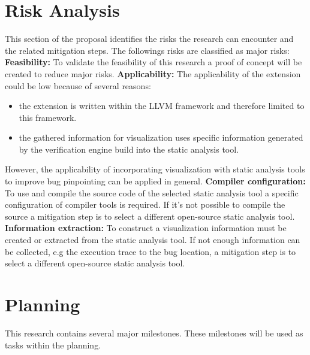 \section{Risk Analysis}
This section of the proposal identifies the risks the research can encounter and the related mitigation steps. \newline \newline
The followings risks are classified as major risks: \newline \newline
\textbf{Feasibility:} \newline
To validate the feasibility of this research a proof of concept will be created to reduce major risks. \newline
\textbf{Applicability:} \newline
The applicability of the extension could be low because of several reasons: \newline
\begin{itemize}
\item the extension is written within the LLVM framework and therefore limited to this framework.
\item the gathered information for visualization uses specific information generated by the verification engine build into the static analysis tool.
\end{itemize}
However, the applicability of incorporating visualization with static analysis tools to improve bug pinpointing can be applied in general. \newline \newline
\textbf{Compiler configuration:}\newline
To use and compile the source code of the selected static analysis tool a specific configuration of compiler tools is required. If it’s not possible to compile the source a mitigation step is to select a different open-source static analysis tool. \newline \newline
\textbf{Information extraction:} \newline
To construct a visualization information must be created or extracted from the static analysis tool. If not enough information can be collected, e.g the execution trace to the bug location, a mitigation step is to select a different open-source static analysis tool.
\section{Planning}
This research contains several major milestones. These milestones will be used as tasks within the planning.  \newline \newline

